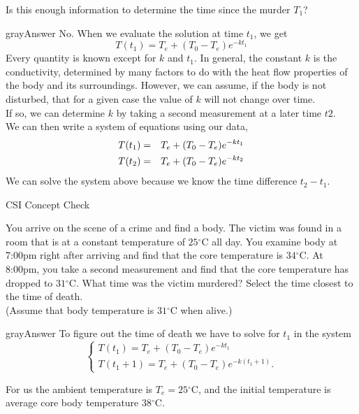 \begin{question}
  Is this enough information to determine the time since the murder $T_1$? 
\end{question}
\begin{mybox}{gray}{Answer}
  No. When we evaluate the solution at time $t_1$, we get
  \begin{equation*}
    \displaystyle  T(t_1) = T_ e+(T_0-T_ e)e^{-kt_1}
  \end{equation*}
  Every quantity is known except for $k$ and $t_1$.
  In general, the constant $k$ is the conductivity,
  determined by many factors to do with the heat flow properties of the body and its surroundings.
  However, we can assume, if the body is not disturbed,
  that for a given case the value of $k$ will not change over time.\\

  If so, we can determine $k$ by taking a second measurement at a later time $t2$.\\

  We can then write a system of equations using our data,
  \begin{eqnarray*}
    \displaystyle  T(t_1) \displaystyle &=& T_ e+(T_0-T_ e)e^{-kt_1} \\
    \displaystyle T(t_2) \displaystyle &=& T_ e+(T_0-T_ e)e^{-kt_2}
  \end{eqnarray*}
  We can solve the system above because we know the time difference $t_2 - t_1$. 
\end{mybox}

\begin{exercise}
  CSI Concept Check
\end{exercise}

You arrive on the scene of a crime and find a body.
The victim was found in a room that is at a constant temperature of $25{}^{\circ }\text {C}$ all day.
You examine body at 7:00pm right after arriving and find that the core temperature is $34{}^{\circ }\text {C}$.
At 8:00pm, you take a second measurement and find that the core temperature has dropped to $31{}^{\circ }\text {C}$.
What time was the victim murdered? Select the time closest to the time of death. \\
(Assume that body temperature is $31{}^{\circ }\text {C}$ when alive.)

\begin{mybox}{gray}{Answer}
  To figure out the time of death we have to solve for $t_1$ in the system
  \begin{equation*}
    \displaystyle \begin{cases}
      T\left(t_1\right)= T_ e+\left(T_0-T_ e\right)e^{-kt_1}\\
      T\left(t_1+1\right)= T_ e+\left(T_0-T_ e\right)e^{-k\left(t_1+1\right)}.
    \end{cases}
  \end{equation*}

  For us the ambient temperature is $T_e= 25{}^{\circ}\text{C}$,
  and the initial temperature is average core body temperature $38{}^{\circ}\text{C}$.

\end{mybox}
\clearpage

